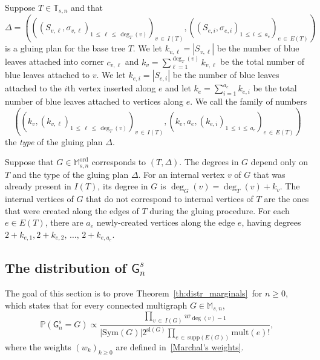 \documentclass[AHL,Unicode,longabstracts,published]{cedram}
\newcommand{\abs}[1]{\left\lvert#1\right\rvert}
\newcommand{\Pp}[1]{\mathbb{P} \left(#1\right)}
\newcommand{\supp}{\mathrm{supp}}
\newcommand{\ord}{\mathrm{ord}}
\newcommand{\sll}{\mathrm{sl}}
\newcommand{\Sym}{\mathrm{Sym}}
\newcommand{\mult}{\mathrm{mult}}
\newcommand{\sG}{\mathsf{G}}
\newcommand{\A}{\mathbb{T}}
\newcommand{\M}{\mathbb{M}}
\begin{document}
Suppose $T \in \A_{s,n}$ and that
\[
\Delta=\left(\left(\left(S_{v,\ell}, \sigma_{v,\ell}\right)_{1\,\le\,\ell\,\le\,\deg_T(v)} \right)_{v\,\in\,I(T)}, \left(\left(S_{e,i},\sigma_{e,i}\right)_{1\,\le\,i\,\le\,a_e} \right)_{e\,\in\,E(T)} \right)
\]
is a gluing plan for the base tree $T$. We let $k_{v,\ell} = |S_{v,\ell}|$ be the number of blue leaves attached into corner $c_{v,\ell}$ and $k_v = \sum_{\ell=1}^{\deg_T(v)} k_{v,\ell}$ be the total number of blue leaves attached to $v$. We let $k_{e,i} = |S_{e,i}|$ be the number of blue leaves attached to the $i$th vertex inserted along $e$ and let $k_e = \sum_{i=1}^{a_e} k_{e,i}$ be the total number of blue leaves attached to vertices along $e$. We call the family of numbers
\[
\left(\left(k_v,\left(k_{v,\ell}\right)_{1\,\leq\,\ell\,\leq\,\deg_T(v)}\right)_{v\,\in\,I(T)}, \left(k_e,a_e,\left(k_{e,i}\right)_{1\,\leq\,i\,\leq \,a_e}\right)_{e\,\in\,E(T)} \right)
\]
the \emph{type} of the gluing plan $\Delta$.


\begin{rema}
Suppose that $G \in \M_{s,n}^{\ord}$ corresponds to $(T,\Delta)$. The degrees in $G$ depend only on $T$ and the type of the gluing plan $\Delta$. For an internal vertex $v$ of $G$ that was already present in $I(T)$, its degree in $G$ is $\deg_G(v)=\deg_T(v)+k_v$. The internal vertices of $G$ that do not correspond to internal vertices of $T$ are the ones that were created along the edges of $T$ during the gluing procedure. For each $e\in E(T)$, there are $a_e$ newly-created vertices along the edge $e$, having degrees $2+k_{e,1}, 2+k_{e,2},\, \dots,\, 2+k_{e,a_e}$.
\end{rema}


\subsection{The distribution of \texorpdfstring{$\sG^s_{n}$}{sGsn}}\label{sec:calculations}

The goal of this section is to prove Theorem~\ref{th:distr_marginals}~for $n\geq 0$, which states that for every connected multigraph $G\in \M_{s,n}$,
\[
\Pp{\sG_{n}^s=G}\propto\frac{\prod\limits_{v\,\in\, I(G)} w_{\deg(v)-1}}{\abs{\Sym(G)}2^{\sll(G)}\prod\limits_{e\,\in\,\supp(E(G))}\mult(e)!},
\]
where the weights $(w_k)_{k\geq 0}$ are defined in~\eqref{Marchal's weights}.
\end{document}
